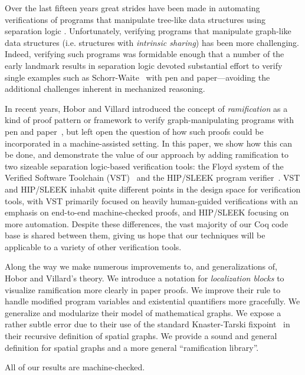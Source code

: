 Over the last fifteen years great strides have been made in automating verifications of programs that manipulate
tree-like data structures using separation logic 
\cite{berdine:smallfoot,chin:hipsleek,jacobs:verifast,chlipala:bedrock,bengtson:charge,appel:programlogics}.  Unfortunately, verifying programs that manipulate graph-like data structures (i.e. structures with \emph{intrinsic sharing}) has been more challenging.  Indeed, verifying such programs was formidable enough that a number of the early landmark results in separation logic devoted substantial effort to verify single examples such as Schorr-Waite~\cite{hongseok:phd} with pen and paper---avoiding the additional challenges inherent in mechanized reasoning.

In recent years, Hobor and Villard introduced the concept of \emph{ramification} as a kind of proof pattern or framework to verify graph-manipulating programs with pen and paper~\cite{hobor:ramification}, but left open the question of how such proofs could be incorporated in a machine-assisted setting.  In this paper, we show how this can be done, and demonstrate the value of our approach by adding ramification to two sizeable separation logic-based verification tools: the Floyd system of the Verified Software Toolchain (VST)~\cite{appel:programlogics} and the HIP/SLEEK program verifier~\cite{chin:hipsleek}.  VST and HIP/SLEEK inhabit quite different points in the design space for verification tools, with VST primarily focused on heavily human-guided verifications with an emphasis on end-to-end machine-checked proofs, and HIP/SLEEK focusing on more automation.  Despite these differences, the vast majority of our Coq code base is shared between them,
giving us hope that our techniques will be applicable to a variety of other verification tools.

Along the way we make numerous improvements to, and generalizations of, Hobor and Villard's theory.  We introduce a notation for \emph{localization blocks} to visualize ramification more clearly in paper proofs.  We improve their  rule to handle modified program variables and existential quantifiers more gracefully.  We generalize and modularize their model of mathematical graphs.  We expose a rather subtle error due to their use of the standard Knaster-Tarski fixpoint~\cite{tarski:fixpoint} in their recursive definition of spatial graphs.  We provide a sound and general definition for spatial graphs and a more general ``ramification library''.

All of our results are machine-checked. %


